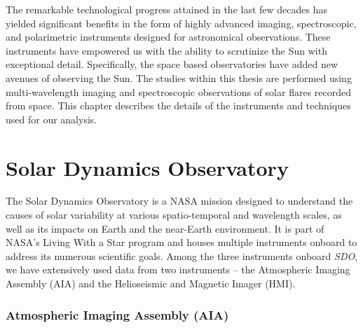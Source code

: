 


\justifying

The remarkable technological progress attained in the last few decades has yielded significant benefits in the form of highly advanced imaging, spectroscopic, and polarimetric instruments designed for astronomical observations. These instruments have empowered us with the ability to scrutinize the Sun with exceptional detail. Specifically, the space based observatories have added new avenues of observing the Sun. The studies within this thesis are performed using multi-wavelength imaging and spectroscopic observations of solar flares recorded from space. This chapter describes the details of the instruments and techniques used for our analysis.

\section{Solar Dynamics Observatory}

The Solar Dynamics Observatory \citep[SDO;][]{sdo} is a NASA mission designed to understand the causes of solar variability at various spatio-temporal and wavelength scales, as well as its impacts on Earth and the near-Earth environment. It is part of NASA’s Living With a Star program and houses multiple instruments onboard to address its numerous scientific goals. Among the three instruments onboard {\it SDO}, we have extensively used data from two instruments – the Atmospheric Imaging Assembly (AIA) and the Helioseismic and Magnetic Imager (HMI).

\subsubsection{Atmospheric Imaging Assembly (AIA)}

